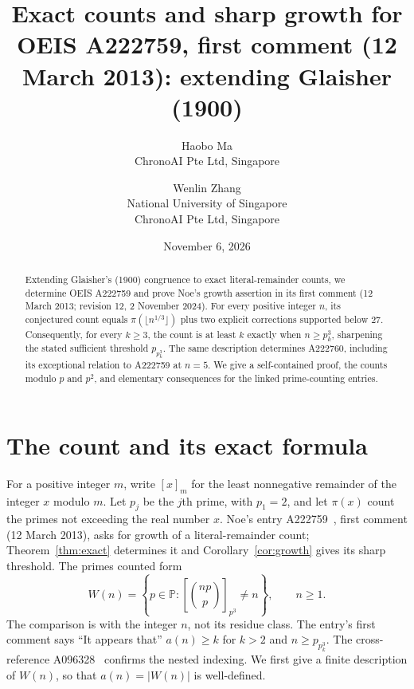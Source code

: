 \documentclass[11pt]{article}
\title{Exact counts and sharp growth for OEIS A222759, first comment
(12 March 2013): extending Glaisher (1900)}
\author{Haobo Ma\\\small ChronoAI Pte Ltd, Singapore
\and Wenlin Zhang\\\small National University of Singapore\\
\small ChronoAI Pte Ltd, Singapore}
\date{November 6, 2026}
\newcommand{\pr}{\mathbb P}
\newcommand{\binrem}[3]{\left[\binom{#1#2}{#2}\right]_{#2^{#3}}}
\begin{document}
\maketitle
\begin{abstract}
Extending Glaisher's (1900) congruence to exact literal-remainder counts,
we determine OEIS A222759 and prove Noe's growth assertion in its first comment
(12 March 2013; revision 12, 2 November 2024).
For every positive integer $n$, its conjectured count equals
$\pi(\lfloor n^{1/3}\rfloor)$ plus two explicit corrections supported below $27$.
Consequently, for every $k\ge3$, the count is at least $k$ exactly when
$n\ge p_k^3$, sharpening the stated sufficient threshold $p_{p_k^3}$.
The same description determines A222760, including its exceptional relation
to A222759 at $n=5$. We give a self-contained proof, the counts modulo $p$
and $p^2$, and elementary consequences for the linked prime-counting entries.
\end{abstract}

\section{The count and its exact formula}
For a positive integer $m$, write $[x]_m$ for the least nonnegative remainder
of the integer $x$ modulo $m$. Let $p_j$ be the $j$th prime, with $p_1=2$,
and let $\pi(x)$ count the primes not exceeding the real number $x$.
Noe's entry A222759~\cite{noe}, first comment (12 March 2013), asks for
growth of a literal-remainder count; Theorem~\ref{thm:exact} determines it
and Corollary~\ref{cor:growth} gives its sharp threshold.
The primes counted form
\[
 W(n)=\left\{p\in\pr:\binrem{n}{p}{3}\ne n\right\},\qquad n\ge1.
\]
The comparison is with the integer $n$, not its residue class. The entry's
first comment says ``It appears that'' $a(n)\ge k$ for $k>2$ and
$n\ge p_{p_k^3}$. The cross-reference A096328~\cite{nested} confirms the
nested indexing. We first give a finite description of $W(n)$, so that
$a(n)=|W(n)|$ is well-defined.
\end{document}
